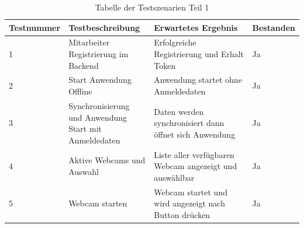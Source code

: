 \begin{table}[h]
	\centering
	\begin{tabular}{|p{0.15\linewidth}|p{0.3\linewidth}|p{0.4\linewidth}|p{0.15\linewidth}|}
		\hline
		Testnummer & Testbeschreibung & Erwartetes Ergebnis & Bestanden \\ \hline
		1 & Mitarbeiter Registrierung im Backend & Erfolgreiche Registrierung und Erhalt Token & Ja\\ \hline
		2 & Start Anwendung Offline & Anwendung startet ohne Anmeldedaten & Ja \\ \hline
		3 & Synchronisierung und Anwendung Start mit Anmeldedaten & Daten werden synchronisiert dann öffnet sich Anwendung & Ja \\ \hline
		4 & Aktive Webcams und Auswahl & Liste aller verfügbaren Webcam angezeigt und auswählbar & Ja \\ \hline
		5 & Webcam starten & Webcam startet und wird angezeigt nach Button drücken & Ja  \\ \hline
	\end{tabular}
	\caption{Tabelle der Testszenarien Teil 1}
\end{table}



